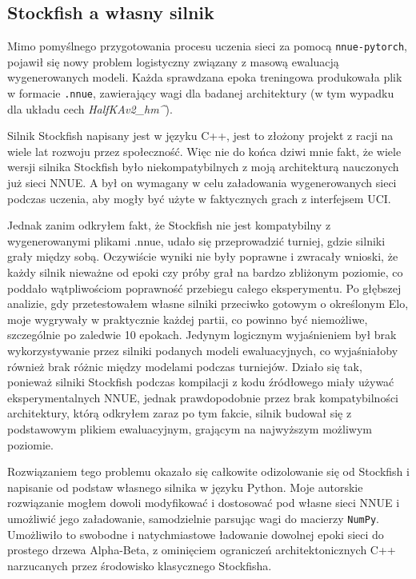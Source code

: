 \documentclass[12pt,a4paper]{report}
\begin{document}
\subsection{Stockfish a własny silnik}

Mimo pomyślnego przygotowania procesu uczenia sieci za pomocą \texttt{nnue-pytorch}, pojawił się nowy problem logistyczny związany z masową ewaluacją wygenerowanych modeli. Każda sprawdzana epoka treningowa produkowała plik w formacie \texttt{.nnue}, zawierający wagi dla badanej architektury (w tym wypadku dla układu cech \textit{HalfKAv2\_hm\string^}).

Silnik Stockfish napisany jest w języku C++, jest to złożony projekt z racji na wiele lat rozwoju przez społeczność. Więc nie do końca dziwi mnie fakt, że wiele wersji silnika Stockfish było niekompatybilnych z moją architekturą nauczonych już sieci NNUE. A był on wymagany w celu załadowania wygenerowanych sieci podczas uczenia, aby mogły być użyte w faktycznych grach z interfejsem UCI.

Jednak zanim odkryłem fakt, że Stockfish nie jest kompatybilny z wygenerowanymi plikami .nnue, udało się przeprowadzić turniej, gdzie silniki grały między sobą. Oczywiście wyniki nie były poprawne i zwracały wnioski, że każdy silnik nieważne od epoki czy próby grał na bardzo zbliżonym poziomie, co poddało wątpliwościom poprawność przebiegu całego eksperymentu. Po głębszej analizie, gdy przetestowałem własne silniki przeciwko gotowym o określonym Elo, moje wygrywały w praktycznie każdej partii, co powinno być niemożliwe, szczególnie po zaledwie 10 epokach. Jedynym logicznym wyjaśnieniem był brak wykorzystywanie przez silniki podanych modeli ewaluacyjnych, co wyjaśniałoby również brak różnic między modelami podczas turniejów. Działo się tak, ponieważ silniki Stockfish podczas kompilacji z kodu źródłowego miały używać eksperymentalnych NNUE, jednak prawdopodobnie przez brak kompatybilności architektury, którą odkryłem zaraz po tym fakcie, silnik budował się z podstawowym plikiem ewaluacyjnym, grającym na najwyższym możliwym poziomie.

Rozwiązaniem tego problemu okazało się całkowite odizolowanie się od Stockfish i napisanie od podstaw własnego silnika w języku Python. Moje autorskie rozwiązanie mogłem dowoli modyfikować i dostosować pod własne sieci NNUE i umożliwić jego załadowanie, samodzielnie parsując wagi do macierzy \texttt{NumPy}. Umożliwiło to swobodne i natychmiastowe ładowanie dowolnej epoki sieci do prostego drzewa Alpha-Beta, z ominięciem ograniczeń architektonicznych C++ narzucanych przez środowisko klasycznego Stockfisha.
\end{document}
